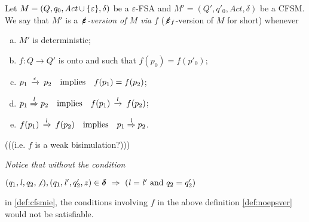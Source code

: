 \begin{definition}
\label{def:noepsver}
Let $M=(Q,q_0,\textit{Act}\cup\{\varepsilon\},\delta)$ be a $\varepsilon$-FSA
and $M'=(Q',q'_0,\textit{Act},\delta)$ be a CFSM.
We say that $M'$ is a {\em $\not\hspace{-1pt}\bm{\varepsilon}$-version of $M$ via $f$} ($\not\hspace{-1pt}\bm{\varepsilon}_f$-version of $M$ for short)
whenever 
\begin{enumerate}[a)]
\item
$M'$ is deterministic;
\item 
$f:Q\to Q'$ is onto and such that $f(p_0) = f(p'_0)$;
\item
$p_1\,\xrightarrow{\epsilon}_{{}}\,p_2 \quad\text{implies}\quad f(p_1)=f(p_2)$; 
\item
$p_1\LTS{\elle}p_2 \quad\text{implies}\quad f(p_1)\lts{\elle}f(p_2)$; 
\item
\label{def:noepsver-e}
$ f(p_1)\lts{\elle}f(p_2)\quad\text{implies}\quad p_1\LTS{\elle}p_2$.
\end{enumerate}
(((i.e. $f$ is a weak bisimulation?)))

\begin{remark}
\label{rem:neccond}
{\em
Notice that without the condition\\
\centerline{
$(q_1,\mathit{l},q_2,\not\iota), (q_1,\mathit{l}',q'_2,z)\in\bm{\delta} ~\Rightarrow~ (\mathit{l}=\mathit{l}' \text{ and } q_2=q'_2)$}
in \cref{def:cfsmie}, the conditions involving $f$ in the above definition \cref{def:noepsver} would not be satisfiable. \finex
}
\end{remark}


\end{definition}
